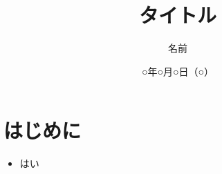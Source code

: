 \documentclass{jsarticle}
\title{タイトル}
\author{名前} %
\date{○年○月○日（○）} %
\begin{document}
\maketitle

\tableofcontents

\section{はじめに}
\begin{itemize}
  \item はい
\end{itemize}
\end{document}
